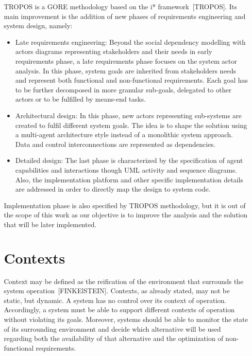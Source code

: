 TROPOS is a GORE methodology based on the i* framework~[TROPOS]. Its main improvement is the addition of new phases of requirements engineering and system design, namely:

\begin{itemize}

\item Late requirements engineering: Beyond the social dependency modelling with actors diagrams representing stakeholders and their needs in early requirements phase, a late requirements phase focuses on the system actor analysis. In this phase, system goals are inherited from stakeholders needs and represent both functional and non-functional requirements. Each goal has to be further decomposed in more granular sub-goals, delegated to other actors or to be fulfilled by means-end tasks. 
\medskip

\item Architectural design: In this phase, new actors representing sub-systems are created to fulfil different system goals. The idea is to shape the solution using a multi-agent architecture style instead of a monolithic system approach. Data and control interconnections are represented as dependencies.
\medskip

\item Detailed design: The last phase is characterized by the specification of agent capabilities and interactions though UML activity and sequence diagrams. Also, the implementation platform and other specific implementation details are addressed in order to directly map the design to system code.

\end{itemize}

Implementation phase is also specified by TROPOS methodology, but it is out of the scope of this work as our objective is to improve the analysis and the solution that will be later implemented.

\section{Contexts}

Context may be defined as the reification of the environment that surrounds the system operation~[FINKElSTEIN]. Contexts, as already stated, may not be static, but dynamic. A system has no control over its context of operation. Accordingly, a system must be able to support different contexts of operation without violating its goals. Moreover, systems should be able to monitor the state of its surrounding environment and decide which alternative will be used regarding both the availability of that alternative and the optimization of non-functional requirements.

